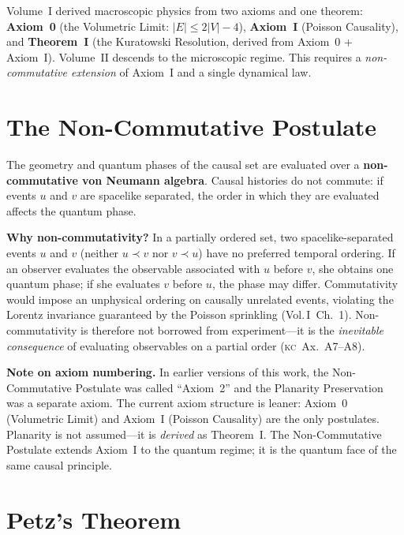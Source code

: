 \documentclass[11pt, a4paper, openany]{book}
\newcommand{\KC}[1]{\textnormal{(\textsc{kc}~#1)}}
\newcommand{\VolI}[1]{\textnormal{(Vol.\,I~#1)}}
\begin{document}
\noindent
Volume~I derived macroscopic physics from two axioms and one theorem:
\textbf{Axiom~0} (the Volumetric Limit: $|E| \leq 2|V| - 4$),
\textbf{Axiom~I} (Poisson Causality), and \textbf{Theorem~I} (the
Kuratowski Resolution, derived from Axiom~0 + Axiom~I).
Volume~II descends to the microscopic regime.  This requires
a \emph{non-commutative extension} of Axiom~I and a single dynamical law.

\section*{The Non-Commutative Postulate}

\begin{axiom}\label{ax:quantum}
The geometry and quantum phases of the causal set are evaluated over a \textbf{non-commutative von Neumann algebra}. Causal histories do not commute: if events $u$ and $v$ are spacelike separated, the order in which they are evaluated affects the quantum phase.
\end{axiom}

\noindent
\textbf{Why non-commutativity?} In a partially ordered set, two spacelike-separated events $u$ and $v$ (neither $u \prec v$ nor $v \prec u$) have no preferred temporal ordering. If an observer evaluates the observable associated with $u$ before $v$, she obtains one quantum phase; if she evaluates $v$ before $u$, the phase may differ. Commutativity would impose an unphysical ordering on causally unrelated events, violating the Lorentz invariance guaranteed by the Poisson sprinkling \VolI{Ch.~1}. Non-commutativity is therefore not borrowed from experiment---it is the \emph{inevitable consequence} of evaluating observables on a partial order \KC{Ax.~A7--A8}.

\medskip\noindent
\textbf{Note on axiom numbering.} In earlier versions of this work, the
Non-Commutative Postulate was called ``Axiom~2'' and the Planarity
Preservation was a separate axiom.  The current axiom structure is
leaner: Axiom~0 (Volumetric Limit) and Axiom~I (Poisson Causality) are
the only postulates.  Planarity is not assumed---it is \emph{derived} as
Theorem~I.  The Non-Commutative Postulate extends Axiom~I to the quantum
regime; it is the quantum face of the same causal principle.

\section*{Petz's Theorem}
\end{document}

